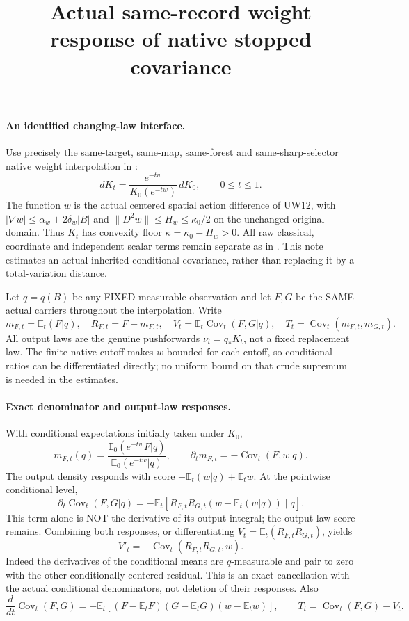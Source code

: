 \documentclass[11pt]{article}
\title{Actual same-record weight response of native stopped covariance}\author{}\date{}
\newcommand{\E}{\mathbb E}
\newcommand{\Cov}{\operatorname{Cov}}
\begin{document}
\maketitle
\paragraph{An identified changing-law interface.}
Use precisely the same-target, same-map, same-forest and same-sharp-selector native
weight interpolation in \cite[Section~4]{ND}:
\[
 dK_t=\frac{e^{-tw}}{K_0(e^{-tw})}\,dK_0,\qquad0\le t\le1.
\]
The function $w$ is the actual centered spatial action difference of UW12, with
$|\nabla w|\le\alpha_w+2\delta_w|B|$ and
$\|D^2w\|\le H_w\le\kappa_0/2$ on the unchanged original domain.
Thus $K_t$ has convexity floor $\kappa=\kappa_0-H_w>0$.
All raw classical, coordinate and independent scalar terms remain separate as in \cite[(4.8)]{ND}.
This note estimates an actual inherited conditional covariance, rather than replacing it
by a total-variation distance.

Let $q=q(B)$ be any FIXED measurable observation and let $F,G$ be the SAME actual
carriers throughout the interpolation. Write
\[
 m_{F,t}=\E_t(F|q),\quad R_{F,t}=F-m_{F,t},\quad
 V_t=\E_t\Cov_t(F,G|q),\quad T_t=\Cov_t(m_{F,t},m_{G,t}).
\]
All output laws are the genuine pushforwards $\nu_t=q_*K_t$, not a fixed replacement law.
The finite native cutoff makes $w$ bounded for each cutoff, so conditional ratios can be
differentiated directly; no uniform bound on that crude supremum is needed in the estimates.

\paragraph{Exact denominator and output-law responses.}
With conditional expectations initially taken under $K_0$,
\[
 m_{F,t}(q)=\frac{\E_0(e^{-tw}F|q)}{\E_0(e^{-tw}|q)},\qquad
 \partial_tm_{F,t}=-\Cov_t(F,w|q).
\]
The output density responds with score $-\E_t(w|q)+\E_tw$.
At the pointwise conditional level,
\[
 \partial_t\Cov_t(F,G|q)
 =-\E_t[R_{F,t}R_{G,t}(w-\E_t(w|q))\mid q].
\]
This term alone is NOT the derivative of its output integral; the output-law score remains.
Combining both responses, or differentiating $V_t=\E_t(R_{F,t}R_{G,t})$, yields
\begin{equation}\label{Vresponse}
 V'_t=-\Cov_t(R_{F,t}R_{G,t},w).
\end{equation}
Indeed the derivatives of the conditional means are $q$-measurable and pair to zero
with the other conditionally centered residual. This is an exact cancellation with the
actual conditional denominators, not deletion of their responses.
Also
\[
 \frac d{dt}\Cov_t(F,G)
 =-\E_t[(F-\E_tF)(G-\E_tG)(w-\E_tw)],\qquad
 T_t=\Cov_t(F,G)-V_t.
\]
\end{document}

